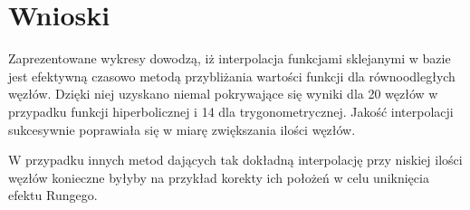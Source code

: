 \newpage
\section{Wnioski}

Zaprezentowane wykresy dowodzą, iż interpolacja funkcjami sklejanymi w bazie jest efektywną czasowo metodą przybliżania wartości funkcji dla równoodległych węzłów. Dzięki niej uzyskano niemal pokrywające się wyniki dla 20 węzłów w przypadku funkcji hiperbolicznej i 14 dla trygonometrycznej. Jakość interpolacji sukcesywnie poprawiała się w miarę zwiększania ilości węzłów.

W przypadku innych metod dających tak dokładną interpolację przy niskiej ilości węzłów konieczne byłyby na przykład korekty ich położeń w celu uniknięcia efektu Rungego.

